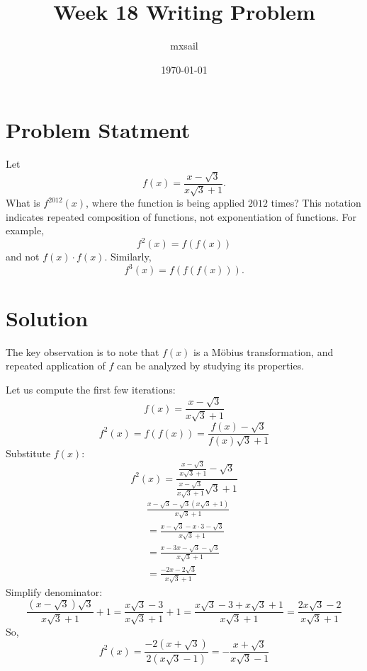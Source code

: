 \documentclass{article}
\title{Week 18 Writing Problem}
\author{mxsail}
\date{\today}
\begin{document}
\maketitle

\section*{Problem Statment}
Let
\[f(x) = \frac{x - \sqrt{3}}{x\sqrt{3} + 1}.\]What is $f^{2012}(x)$, where the function is being applied $2012$ times?
This notation indicates repeated composition of functions, not exponentiation of functions. For example,\[f^2(x)=f(f(x))\]and not $f(x) \cdot f(x).$ Similarly,\[f^3(x)=f(f(f(x))).\]

\section*{Solution}
The key observation is to note that $f(x)$ is a Möbius transformation, and repeated application of $f$ can be analyzed by studying its properties.

Let us compute the first few iterations:
\[
f(x) = \frac{x - \sqrt{3}}{x\sqrt{3} + 1}
\]
\[
f^2(x) = f(f(x)) = \frac{f(x) - \sqrt{3}}{f(x)\sqrt{3} + 1}
\]
Substitute $f(x)$:
\[
f^2(x) = \frac{\frac{x - \sqrt{3}}{x\sqrt{3} + 1} - \sqrt{3}}{\frac{x - \sqrt{3}}{x\sqrt{3} + 1}\sqrt{3} + 1}
\]
\begin{align*}
&\frac{x - \sqrt{3} - \sqrt{3}(x\sqrt{3} + 1)}{x\sqrt{3} + 1} \\
&= \frac{x - \sqrt{3} - x\cdot 3 - \sqrt{3}}{x\sqrt{3} + 1} \\
&= \frac{x - 3x - \sqrt{3} - \sqrt{3}}{x\sqrt{3} + 1} \\
&= \frac{-2x - 2\sqrt{3}}{x\sqrt{3} + 1}
\end{align*}
Simplify denominator:
\[
\frac{(x - \sqrt{3})\sqrt{3}}{x\sqrt{3} + 1} + 1
= \frac{x\sqrt{3} - 3}{x\sqrt{3} + 1} + 1
= \frac{x\sqrt{3} - 3 + x\sqrt{3} + 1}{x\sqrt{3} + 1}
= \frac{2x\sqrt{3} - 2}{x\sqrt{3} + 1}
\]
So,
\[
f^2(x) = \frac{-2(x + \sqrt{3})}{2(x\sqrt{3} - 1)} = -\frac{x + \sqrt{3}}{x\sqrt{3} - 1}
\]
\end{document}
